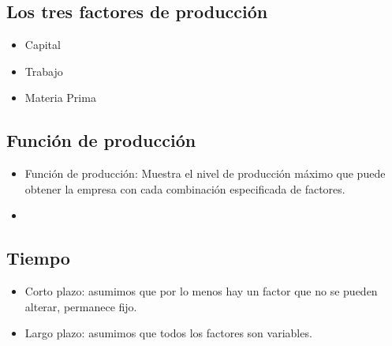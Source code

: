 
\subsection{Los tres factores de producción}
\begin{itemize}
    \item Capital 
    \item Trabajo
    \item Materia Prima 
\end{itemize}


\subsection{Función de producción}
\begin{itemize}
    \item Función de producción: Muestra el nivel de producción máximo que puede obtener la empresa con cada combinación especificada de factores. 
    \item 
\end{itemize}


\subsection{Tiempo}
\begin{itemize}
    \item Corto plazo: asumimos que por lo menos hay un factor que no se pueden alterar, permanece fijo.
    \item Largo plazo: asumimos que todos los factores son variables.
\end{itemize}




